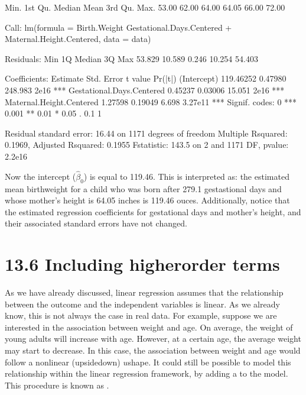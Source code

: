 \documentclass[letterpaper,10pt,english]{jupyterBook}
\begin{document}
\begin{sphinxVerbatim}[commandchars=\\\{\}]
   Min. 1st Qu.  Median    Mean 3rd Qu.    Max. 
  53.00   62.00   64.00   64.05   66.00   72.00 
\end{sphinxVerbatim}

\begin{sphinxVerbatim}[commandchars=\\\{\}]
Call:
lm(formula = Birth.Weight \PYGZti{} Gestational.Days.Centered + Maternal.Height.Centered, 
    data = data)

Residuals:
    Min      1Q  Median      3Q     Max 
\PYGZhy{}53.829 \PYGZhy{}10.589   0.246  10.254  54.403 

Coefficients:
                           Estimate Std. Error t value Pr(\PYGZgt{}|t|)    
(Intercept)               119.46252    0.47980 248.983  \PYGZlt{} 2e\PYGZhy{}16 ***
Gestational.Days.Centered   0.45237    0.03006  15.051  \PYGZlt{} 2e\PYGZhy{}16 ***
Maternal.Height.Centered    1.27598    0.19049   6.698 3.27e\PYGZhy{}11 ***
\PYGZhy{}\PYGZhy{}\PYGZhy{}
Signif. codes:  0 \PYGZsq{}***\PYGZsq{} 0.001 \PYGZsq{}**\PYGZsq{} 0.01 \PYGZsq{}*\PYGZsq{} 0.05 \PYGZsq{}.\PYGZsq{} 0.1 \PYGZsq{} \PYGZsq{} 1

Residual standard error: 16.44 on 1171 degrees of freedom
Multiple R\PYGZhy{}squared:  0.1969,	Adjusted R\PYGZhy{}squared:  0.1955 
F\PYGZhy{}statistic: 143.5 on 2 and 1171 DF,  p\PYGZhy{}value: \PYGZlt{} 2.2e\PYGZhy{}16
\end{sphinxVerbatim}

\sphinxAtStartPar
Now the intercept (\(\hat{\beta}_0\)) is equal to 119.46. This is interpreted as: the estimated mean birthweight for a child who was born after 279.1 gestastional days and whose mother’s height is 64.05 inches is 119.46 ouces. Additionally, notice that the estimated regression coefficients for gestational days and mother’s height, and their associated standard errors have not changed.


\section{13.6  Including higher\sphinxhyphen{}order terms}
\label{\detokenize{13.f. Linear Regression II:including-higher-order-terms}}\label{\detokenize{13.f. Linear Regression II::doc}}
\sphinxAtStartPar
As we have already discussed, linear regression assumes that the relationship between the outcome and the independent variables is linear. As we already know, this is not always the case in real data. For example, suppose we are interested in the association between weight and age. On average, the weight of young adults will increase with age. However, at a certain age, the average weight may start to decrease. In this case, the association between weight and age would follow a non\sphinxhyphen{}linear (upside\sphinxhyphen{}down) \(u\)\sphinxhyphen{}shape. It could still be possible to model this relationship within the linear regression framework, by adding a  to the model. This procedure is known as .
\end{document}
